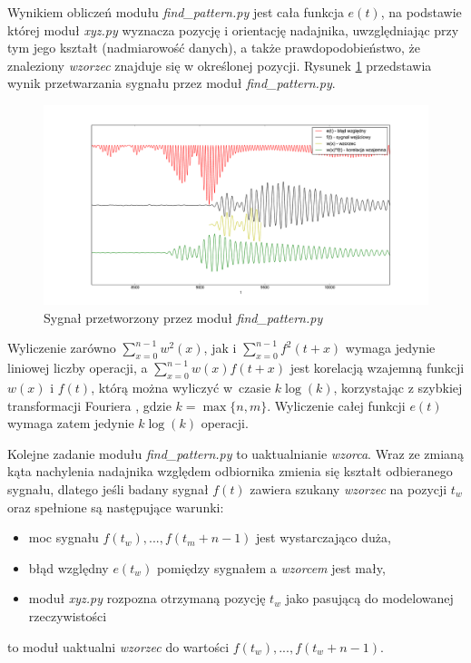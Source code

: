  Wynikiem obliczeń modułu \textit{find\_pattern.py} jest cała funkcja $e(t)$, na podstawie której moduł \textit{xyz.py}
 wyznacza pozycję i orientację nadajnika, uwzględniając przy tym 
 jego kształt (nadmiarowość danych), a także prawdopodobieństwo, że znaleziony \textit{wzorzec} znajduje się w określonej pozycji.
 Rysunek \ref{fig:blad_korel} przedstawia wynik przetwarzania sygnału przez moduł \textit{find\_pattern.py}.

\begin{figure}[h]
    \centering
    \includegraphics[width=1.0\textwidth, trim= 50mm 0mm 40mm 0mm,clip]{blad_korel}
    \caption{Sygnał przetworzony przez moduł \textit{find\_pattern.py}}
    \label{fig:blad_korel}
\end{figure}
 
 
 Wyliczenie zarówno $ \sum\limits_{x=0}^{n-1}  w^2(x) $,
jak i $\sum\limits_{x=0}^{n-1} f^2(t+x)$ wymaga jedynie liniowej liczby operacji, a 
 $\sum\limits_{x=0}^{n-1}  w(x) f(t+x) $ jest korelacją wzajemną funkcji $w(x)$ i $f(t)$, którą
 można wyliczyć w~czasie $k \log(k)$, korzystając z szybkiej transformacji Fouriera \cite{bib:FFT_correlation},
 gdzie $k = \max \{n,m\}$. Wyliczenie całej funkcji $e(t)$ wymaga zatem jedynie $k \log(k)$ operacji.

 
 Kolejne zadanie modułu \textit{find\_pattern.py} to uaktualnianie \textit{wzorca}.
 Wraz ze zmianą kąta nachylenia nadajnika względem odbiornika zmienia się kształt odbieranego sygnału,
 dlatego jeśli badany sygnał $f(t)$ zawiera szukany \textit{wzorzec} na pozycji $t_w$ 
 oraz spełnione są następujące warunki:
 \begin{itemize}
  \item moc sygnału $f(t_w), ..., f(t_m+n-1)$ jest wystarczająco duża,
  \item błąd względny $e(t_w)$ pomiędzy sygnałem a \textit{wzorcem} jest mały,
  \item moduł \textit{xyz.py} rozpozna otrzymaną pozycję $t_w$ jako pasującą do modelowanej rzeczywistości
 \end{itemize}
to moduł uaktualni \textit{wzorzec} do wartości $f(t_w), ..., f(t_w+n-1)$.
 
